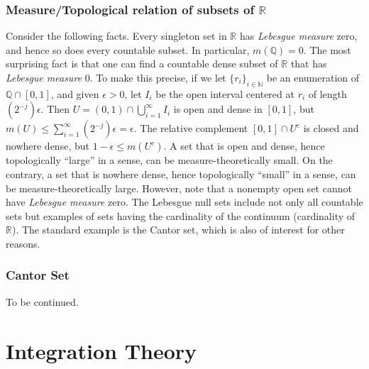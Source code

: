 \documentclass{article}
\begin{document}
\subsubsection{Measure/Topological relation of subsets of $\mathbb{R}$}
Consider the following facts. Every singleton set in $\mathbb{R}$ has \emph{Lebesgue measure} zero, and hence so does every countable subset. In particular, $m(\mathbb{Q})=0$. The most surprising fact is that one can find a countable dense subset of $\mathbb{R}$ that has \emph{Lebesgue measure} 0. \newline \newline 
To make this precise, if we let $\{r_i\}_{i\in\mathbb{N}}$ be an enumeration of $\mathbb{Q}\cap[0,1]$, and given $\epsilon>0$, let $I_i$ be the open interval centered at $r_i$ of length $(2^{-j})\epsilon$. Then $U=(0,1)\cap\bigcup_{i=1}^{\infty}I_i$ is open and dense in $[0,1]$, but $m(U) \leq \sum_{i=1}^{\infty}(2^{-j})\epsilon=\epsilon$. The relative complement $[0,1]\cap U^c$ is closed and nowhere dense, but $1-\epsilon\leq m(U^c)$. A set that is open and dense, hence topologically ``large'' in a sense, can be measure-theoretically small. On the contrary, a set that is nowhere dense, hence  topologically ``small'' in a sense, can be measure-theoretically large. However, note that a nonempty open set cannot have \emph{Lebesgue measure} zero. \newline \newline 
The Lebesgue null sets include not only all countable sets but examples of sets having the cardinality of the continuum (cardinality of $\mathbb{R}$). The standard example is the Cantor set, which is also of interest for other reasons.
\subsubsection{Cantor Set}
To be continued. \newline \newline 
\section{Integration Theory}
\end{document}
